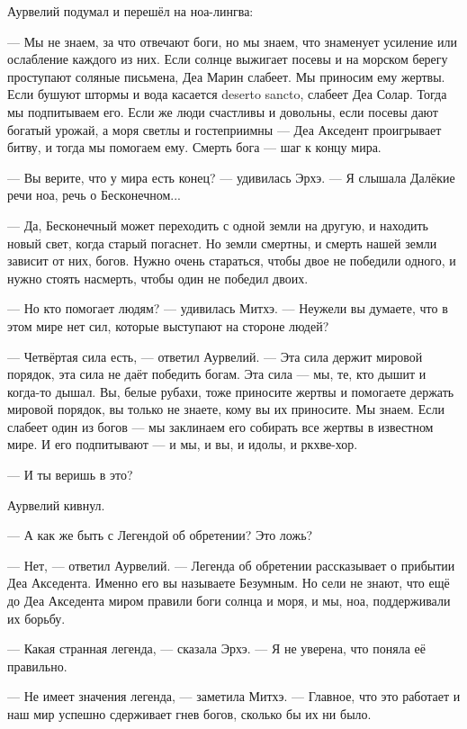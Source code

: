 Аурвелий подумал и перешёл на ноа-лингва:

--- Мы не знаем, за что отвечают боги, но мы знаем, что знаменует усиление или ослабление каждого из них.
Если солнце выжигает посевы и на морском берегу проступают соляные письмена, Деа Марин слабеет.
Мы приносим ему жертвы.
Если бушуют штормы и вода касается deserto sancto\FM, слабеет Деа Солар.
Тогда мы подпитываем его.
Если же люди счастливы и довольны, если посевы дают богатый урожай, а моря светлы и гостеприимны --- Деа Акседент проигрывает битву, и тогда мы помогаем ему.
Смерть бога --- шаг к концу мира.

--- Вы верите, что у мира есть конец? --- удивилась Эрхэ.
--- Я слышала Далёкие речи ноа, речь о Бесконечном...

--- Да, Бесконечный может переходить с одной земли на другую, и находить новый свет, когда старый погаснет.
Но земли смертны, и смерть нашей земли зависит от них, богов.
Нужно очень стараться, чтобы двое не победили одного, и нужно стоять насмерть, чтобы один не победил двоих.

--- Но кто помогает людям? --- удивилась Митхэ.
--- Неужели вы думаете, что в этом мире нет сил, которые выступают на стороне людей?

--- Четвёртая сила есть, --- ответил Аурвелий.
--- Эта сила держит мировой порядок, эта сила не даёт победить богам.
Эта сила --- мы, те, кто дышит и когда-то дышал.
Вы, белые рубахи, тоже приносите жертвы и помогаете держать мировой порядок, вы только не знаете, кому вы их приносите.
Мы знаем.
Если слабеет один из богов --- мы заклинаем его собирать все жертвы в известном мире.
И его подпитывают --- и мы, и вы, и идолы, и ркхве-хор.

--- И ты веришь в это?

Аурвелий кивнул.

--- А как же быть с Легендой об обретении?
Это ложь?

--- Нет, --- ответил Аурвелий.
--- Легенда об обретении рассказывает о прибытии Деа Акседента.
Именно его вы называете Безумным.
Но сели не знают, что ещё до Деа Акседента миром правили боги солнца и моря, и мы, ноа, поддерживали их борьбу.

--- Какая странная легенда, --- сказала Эрхэ.
--- Я не уверена, что поняла её правильно.

--- Не имеет значения легенда, --- заметила Митхэ.
--- Главное, что это работает и наш мир успешно сдерживает гнев богов, сколько бы их ни было.

